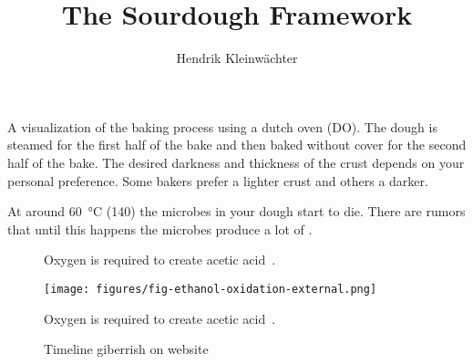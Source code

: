\documentclass[paper=a4, twoside=false, fontsize=12pt, parskip=half,
                bibliography=totoc, listof=totoc]{scrbook}
\author{Hendrik Kleinwächter}
\title{The Sourdough Framework}
\begin{document}

\titlepage

{%
\hypersetup{hidelinks}
\ifdefined\HCode\else\tableofcontents\fi
}




\begin{flowchart}[!htb]
\begin{center}
  
  \caption[Baking process with a dutch oven]{A visualization of the baking
      process using a dutch oven (DO). The dough is steamed for the first half
      of the bake and then baked without cover for the second half of the
      bake. The desired darkness and thickness of the crust depends on your
      personal preference. Some bakers prefer a lighter crust and others a
      darker.}%
  \label{fig:dutch-oven-process}
\end{center}
\end{flowchart}

At around  \qty{60}{\degreeCelsius} (\qty{140}{\degF}) the microbes in your
dough start to die.  There are rumors that until this happens the microbes
produce a lot of .

\begin{figure}[!htb]
\begin{center}
  
  \caption[Acetic acid creation]{Oxygen is required to create acetic
      acid~\cite{acetic+acid+production}.}%
  \label{fig:ethanol-oxidation}
\end{center}
\end{figure}

\begin{figure}[!htb]
  \begin{center}
    \texttt{[image: figures/fig-ethanol-oxidation-external.png]}
    \caption[Acetic acid creation]{Oxygen is required to create acetic
        acid~\cite{acetic+acid+production}.}%
  \end{center}
\end{figure}

\begin{figure}[!htb]
\begin{center}
  
  \caption[Sourdough microbiology timeline]{Timeline giberrish on website}%
\end{center}
\end{figure}
\end{document}
